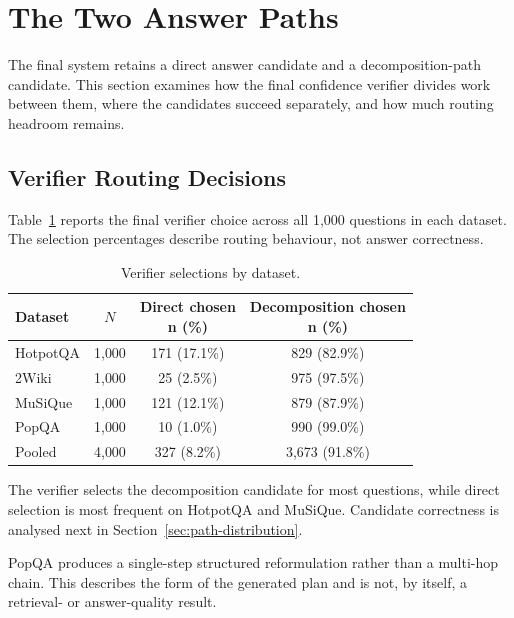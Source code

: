 \section{The Two Answer Paths}
\label{sec:path-analysis}

The final system retains a direct answer candidate and a decomposition-path candidate. This section examines how the final confidence verifier divides work between them, where the candidates succeed separately, and how much routing headroom remains.

\subsection{Verifier Routing Decisions}
\label{sec:path-selection-rate}

Table~\ref{tab:path-selection-rate} reports the final verifier choice across all 1{,}000 questions in each dataset. The selection percentages describe routing behaviour, not answer correctness.

\begin{table}[h]
    \centering
    \caption[Verifier Routing Decisions]{Verifier selections by dataset.}
    \label{tab:path-selection-rate}
    \setlength{\tabcolsep}{6pt}
    \small
    \begin{tabular}{ l c c c }
        \toprule
        Dataset & $N$ & \shortstack{Direct chosen\\n (\%)} & \shortstack{Decomposition chosen\\n (\%)} \\
        \midrule
        HotpotQA & 1{,}000 & 171 (17.1\%) & 829 (82.9\%) \\
        2Wiki & 1{,}000 & 25 (2.5\%) & 975 (97.5\%) \\
        MuSiQue & 1{,}000 & 121 (12.1\%) & 879 (87.9\%) \\
        PopQA & 1{,}000 & 10 (1.0\%) & 990 (99.0\%) \\
        \midrule
        Pooled & 4{,}000 & 327 (8.2\%) & 3{,}673 (91.8\%) \\
        \bottomrule
    \end{tabular}
\end{table}

The verifier selects the decomposition candidate for most questions, while direct selection is most frequent on HotpotQA and MuSiQue. Candidate correctness is analysed next in Section~\ref{sec:path-distribution}.

PopQA produces a single-step structured reformulation rather than a multi-hop chain. This describes the form of the generated plan and is not, by itself, a retrieval- or answer-quality result.

